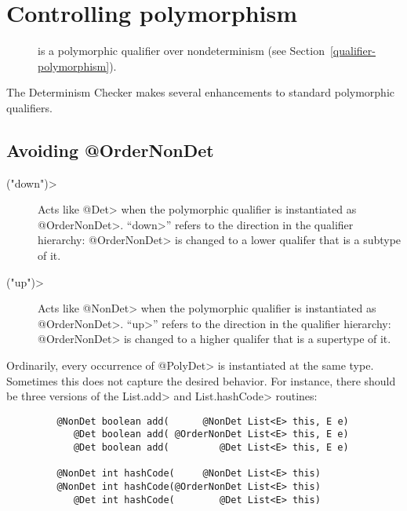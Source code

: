 \section{Controlling polymorphism\label{determinism-polymorphism}}

\begin{description}
\item[] is a
  polymorphic qualifier over nondeterminism (see Section~\ref{qualifier-polymorphism}).
\end{description}

The Determinism Checker makes
several enhancements to standard polymorphic qualifiers.


\subsection{Avoiding @OrderNonDet\label{determinism-polymorphism-ordernondet}}

\begin{description}
\item[\<("down")>]
  Acts like \<@Det> when the polymorphic qualifier is instantiated as
  \<@OrderNonDet>.
  ``\<down>'' refers to the direction in the qualifier hierarchy:
  \<@OrderNonDet> is changed to a lower qualifer that is a subtype of it.
\item[\<("up")>]
  Acts like \<@NonDet> when the polymorphic qualifier is instantiated as
  \<@OrderNonDet>.
  ``\<up>'' refers to the direction in the qualifier hierarchy:
  \<@OrderNonDet> is changed to a higher qualifer that is a supertype of it.
\end{description}

Ordinarily, every occurrence of \<@PolyDet> is instantiated at the same
type.  Sometimes this does not capture the desired behavior.  For instance,
there should be three versions of the \<List.add> and \<List.hashCode> routines:

\begin{Verbatim}
         @NonDet boolean add(      @NonDet List<E> this, E e)
            @Det boolean add( @OrderNonDet List<E> this, E e)
            @Det boolean add(         @Det List<E> this, E e)

         @NonDet int hashCode(     @NonDet List<E> this)
         @NonDet int hashCode(@OrderNonDet List<E> this)
            @Det int hashCode(        @Det List<E> this)
\end{Verbatim}

